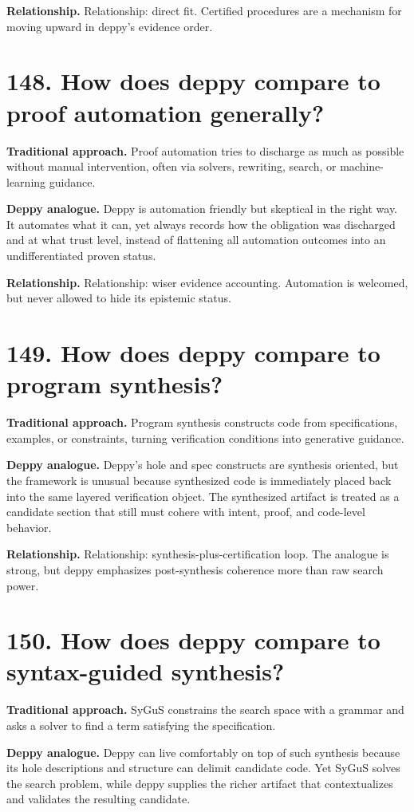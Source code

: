 \documentclass[11pt,openany]{book}
\begin{document}
\textbf{Relationship.} Relationship: direct fit. Certified procedures are a mechanism for moving upward in deppy's evidence order.

\section*{148. How does deppy compare to proof automation generally?}
\textbf{Traditional approach.} Proof automation tries to discharge as much as possible without manual intervention, often via solvers, rewriting, search, or machine-learning guidance.

\textbf{Deppy analogue.} Deppy is automation friendly but skeptical in the right way. It automates what it can, yet always records how the obligation was discharged and at what trust level, instead of flattening all automation outcomes into an undifferentiated proven status.

\textbf{Relationship.} Relationship: wiser evidence accounting. Automation is welcomed, but never allowed to hide its epistemic status.

\section*{149. How does deppy compare to program synthesis?}
\textbf{Traditional approach.} Program synthesis constructs code from specifications, examples, or constraints, turning verification conditions into generative guidance.

\textbf{Deppy analogue.} Deppy's hole and spec constructs are synthesis oriented, but the framework is unusual because synthesized code is immediately placed back into the same layered verification object. The synthesized artifact is treated as a candidate section that still must cohere with intent, proof, and code-level behavior.

\textbf{Relationship.} Relationship: synthesis-plus-certification loop. The analogue is strong, but deppy emphasizes post-synthesis coherence more than raw search power.

\section*{150. How does deppy compare to syntax-guided synthesis?}
\textbf{Traditional approach.} SyGuS constrains the search space with a grammar and asks a solver to find a term satisfying the specification.

\textbf{Deppy analogue.} Deppy can live comfortably on top of such synthesis because its hole descriptions and structure can delimit candidate code. Yet SyGuS solves the search problem, while deppy supplies the richer artifact that contextualizes and validates the resulting candidate.
\end{document}
